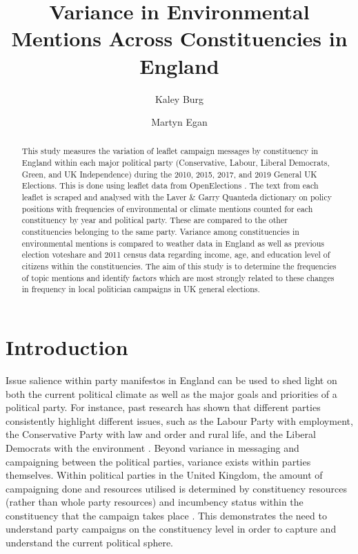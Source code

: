 \documentclass[preprint]{elsarticle} %
\title{Variance in Environmental Mentions Across Constituencies in England}
\author{Kaley Burg}
\author{Martyn Egan}
\begin{document}
	
	\begin{abstract}
		This study measures the variation of leaflet campaign messages by constituency in England within each major political party (Conservative, Labour, Liberal Democrats, Green, and UK Independence) during the 2010, 2015, 2017, and 2019 General UK Elections. This is done using leaflet data from OpenElections \citep{milazzo2020openelections}. The text from each leaflet is scraped and analysed with the Laver \& Garry Quanteda dictionary \citep{laverEstimatingPolicyPositions2000} on policy positions with frequencies of environmental or climate mentions counted for each constituency by year and political party. These are compared to the other constituencies belonging to the same party. Variance among constituencies in environmental mentions is compared to weather data in England as well as previous election voteshare and 2011 census data regarding income, age, and education level of citizens within the constituencies. The aim of this study is to determine the frequencies of topic mentions and identify factors which are most strongly related to these changes in frequency in local politician campaigns in UK general elections.
		

	\end{abstract}
	
	\maketitle %
				
	\newpage
	
	\section{Introduction}
	
Issue salience within party manifestos in England can be used to shed light on both the current political climate as well as the major goals and priorities of a political party. For instance, past research has shown that different parties consistently highlight different issues, such as the Labour Party with employment, the Conservative Party with law and order and rural life, and the Liberal Democrats with the environment \citep{pogorelisIssueSalienceRegional2005}. Beyond variance in messaging and campaigning between the political parties, variance exists within parties themselves. Within political parties in the United Kingdom, the amount of campaigning done and resources utilised is determined by constituency resources (rather than whole party resources) and incumbency status within the constituency that the campaign takes place \citep{pattieIncumbentPartiesIncumbent2017a}. This demonstrates the need to understand party campaigns on the constituency level in order to capture and understand the current political sphere.
\end{document}
